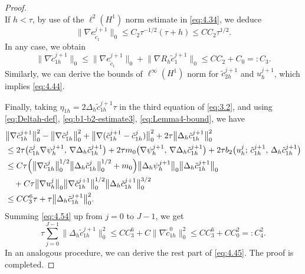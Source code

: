 \documentclass[a4paper,fleqn]{cas-sc}
\numberwithin{equation}{section}
\theoremstyle{definition}
\begin{document}
\begin{proof}
\begin{equation}
\end{equation}
If $h < \tau$, by use of the $\ell^{2}(H^{1})$ norm estimate in \eqref{eq:4.34}, we deduce
\begin{equation}\label{eq:4.52}
  \bigl\|\nabla e_{\tilde{c}_{1}}^{j+1}\bigr\|_{0}
  \leq C_{2}\tau^{-1/2}(\tau+h) \leq CC_{2}\tau^{1/2}.
\end{equation}
In any case, we obtain
\begin{equation}\label{eq:4.53}
  \bigl\|\nabla\tilde{c}_{1h}^{j+1}\bigr\|_{0}
  \leq \bigl\|\nabla e_{\tilde{c}_{1}}^{j+1}\bigr\|_{0}
     + \bigl\|\nabla R_{h}\tilde{c}_{1}^{j+1}\bigr\|_{0}
  \leq CC_{2} + C_{0} =: C_{3}.
\end{equation}
Similarly, we can derive the bounds of $\ell^{\infty}(H^{1})$ norm for
$\tilde{c}_{2h}^{j+1}$ and $u_{h}^{j+1}$, which implies \eqref{eq:4.44}.

Finally, taking $\eta_{1h} = 2\Delta_{h}\tilde{c}_{1h}^{j+1}\tau$ in the third equation
of \eqref{eq:3.2}, and using \eqref{eq:Deltah-def}, \eqref{eq:b1-b2-estimate3},
\eqref{eq:Lemma4-bound}, we have
\begin{align}
  &\bigl\|\nabla\tilde{c}_{1h}^{j+1}\bigr\|_{0}^{2}
   - \bigl\|\nabla\tilde{c}_{1h}^{j}\bigr\|_{0}^{2}
   + \bigl\|\nabla(\tilde{c}_{1h}^{j+1} - \tilde{c}_{1h}^{j})\bigr\|_{0}^{2}
   + 2\tau\bigl\|\Delta_{h}\tilde{c}_{1h}^{j+1}\bigr\|_{0}^{2}
  \nonumber\\
  &\leq 2\tau\bigl(\tilde{c}_{1h}^{j}\nabla\psi_{h}^{j+1},\,
                   \nabla\Delta_{h}\tilde{c}_{1h}^{j+1}\bigr)
       + 2\tau m_{0}\bigl(\nabla\psi_{h}^{j+1},\,
                           \nabla\Delta_{h}\tilde{c}_{1h}^{j+1}\bigr)
       + 2\tau b_{2}\bigl(u_{h}^{j};\, \tilde{c}_{1h}^{j+1},\,
                           \Delta_{h}\tilde{c}_{1h}^{j+1}\bigr)
  \nonumber\\
  &\leq C\tau\Bigl(\bigl\|\nabla\tilde{c}_{1h}^{j}\bigr\|_{0}^{1/2}
                   \bigl\|\Delta_{h}\tilde{c}_{1h}^{j}\bigr\|_{0}^{1/2}
                  + m_{0}\Bigr)
    \bigl\|\Delta_{h}\psi_{h}^{j+1}\bigr\|_{0}
    \bigl\|\Delta_{h}\tilde{c}_{1h}^{j+1}\bigr\|_{0}
  \nonumber\\
  &\quad + C\tau\bigl\|\nabla u_{h}^{j}\bigr\|_{0}
    \bigl\|\nabla\tilde{c}_{1h}^{j+1}\bigr\|_{0}^{1/2}
    \bigl\|\Delta_{h}\tilde{c}_{1h}^{j+1}\bigr\|_{0}^{3/2}
  \nonumber\\
  &\leq CC_{3}^{6}\tau + \tau\bigl\|\Delta_{h}\tilde{c}_{1h}^{j+1}\bigr\|_{0}^{2}.
  \label{eq:4.54}
\end{align}
Summing \eqref{eq:4.54} up from $j = 0$ to $J-1$, we get
\begin{equation}\label{eq:4.55}
  \tau\sum_{j=0}^{J-1}\bigl\|\Delta_{h}\tilde{c}_{1h}^{j+1}\bigr\|_{0}^{2}
  \leq CC_{3}^{6} + C\bigl\|\nabla\tilde{c}_{1h}^{0}\bigr\|_{0}^{2}
  \leq CC_{3}^{6} + CC_{0}^{2} =: C_{4}^{2}.
\end{equation}
In an analogous procedure, we can derive the rest part of \eqref{eq:4.45}. The proof is completed.
\end{proof}
\end{document}
